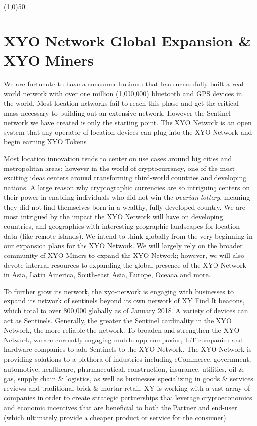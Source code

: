 \documentclass{article}
\begin{document}
\begin{center}
\line(1,0){50}
\end{center}


\section {XYO Network Global Expansion \& XYO Miners}
We are fortunate to have a consumer business that has successfully built a real-world network with over one million (1,000,000) bluetooth and GPS devices in the world. Most location networks fail to reach this phase and get the critical mass necessary to building out an extensive network. However the Sentinel network we have created is only the starting point. The XYO Network is an open system that any operator of location devices can plug into the XYO Network and begin earning XYO Tokens.

Most location innovation tends to center on use cases around big cities and metropolitan areas; however in the world of cryptocurrency, one of the most exciting ideas centers around transforming third-world countries and developing nations. A large reason why cryptographic currencies are so intriguing centers on their power in enabling individuals who did not win the \textit{ovarian lottery}, meaning they did not find themselves born in a wealthy, fully developed country. We are most intrigued by the impact the XYO Network will have on developing countries, and geographies with interesting geographic landscapes for location data (like remote islands). We intend to think globally from the very beginning in our expansion plans for the XYO Network. We will largely rely on the broader community of XYO Miners to expand the XYO Network; however, we will also devote internal resources to expanding the global presence of the XYO Network in Asia, Latin America, South-east Asia, Europe, Oceana and more.

To further grow its network, the \Gls{xyo-network} is engaging with businesses to expand its network of \Glspl{sentinel} beyond its own network of XY Find It beacons, which total to over 800,000 globally as of January 2018. A variety of devices can act as Sentinels. Generally, the greater the Sentinel cardinality in the XYO Network, the more reliable the network. To broaden and strengthen the XYO Network, we are currently engaging mobile app companies, IoT companies and hardware companies to add Sentinels to the XYO Network. The XYO Network is providing solutions to a plethora of industries including eCommerce, government, automotive, healthcare, pharmaceutical, construction, insurance, utilities, oil \& gas, supply chain \& logistics, as well as businesses specializing in goods \& services reviews and traditional brick \& mortar retail. XY is working with a vast array of companies in order to create strategic partnerships that leverage \gls{cryptoeconomics} and economic incentives that are beneficial to both the Partner and end-user (which ultimately provide a cheaper product or service for the consumer).
\end{document}
